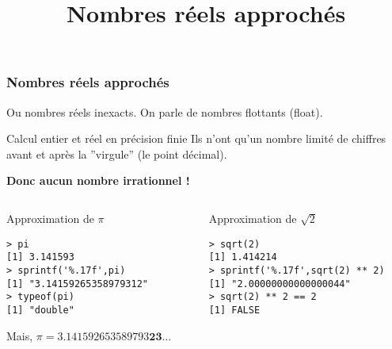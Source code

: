 \documentclass[10pt]{beamer}
\title{Nombres réels approchés}
\begin{document}
\maketitle

\begin{frame}[fragile]
  \frametitle{Nombres réels approchés}
  Ou nombres réels inexacts. On parle de \alert{nombres flottants} (float).

  \begin{alertblock}{Calcul entier et réel en précision finie}
    Ils n'ont qu'un nombre limité de chiffres avant et après la ”virgule” (le point décimal).
  \end{alertblock}
  

  \begin{center}
    \alert{\textbf{Donc aucun nombre irrationnel !}}
  \end{center}
    
\begin{columns}[t]
\begin{column}{0.45\textwidth}
  \begin{exampleblock}{Approximation de $\pi$}
    \begin{lstlisting}[style=block]
> pi
[1] 3.141593
> sprintf('%.17f',pi)
[1] "3.14159265358979312"
> typeof(pi)
[1] "double"
\end{lstlisting}
Mais, $\pi = 3.141592653589793\mathbf{23}\ldots$
  \end{exampleblock}
\end{column}

\begin{column}{0.55\textwidth}
  \begin{exampleblock}{Approximation de $\sqrt 2$}
    \begin{lstlisting}[style=block]
> sqrt(2)
[1] 1.414214      
> sprintf('%.17f',sqrt(2) ** 2)
[1] "2.00000000000000044"
> sqrt(2) ** 2 == 2
[1] FALSE
\end{lstlisting}
\end{exampleblock}
\end{column}
\end{columns}
\end{frame}
\end{document}
